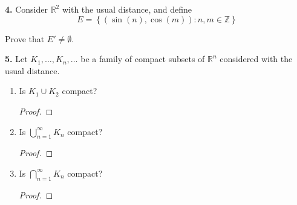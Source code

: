 \documentclass{article}
\newcommand{\R}{\mathbb{R}}
\newcommand{\Z}{\mathbb{Z}}
\newcommand{\set}[1]{\left\{ #1 \right\}}
\newcommand{\paren}[1]{\left( #1 \right)}
\begin{document}
\newpage %


\textbf{4. }
Consider $\R^2$ with the usual distance, and define
$$E = \set{\paren{\sin(n), \cos(m)} : n, m \in \Z}$$

Prove that $E' \ne \emptyset$.


\newpage %


\textbf{5. }
Let $K_1, \dots, K_n, \dots$ be a family of compact subsets of $\R^n$ considered with the usual distance.
\begin{enumerate}
    \item 
    Is $K_1 \cup K_2$ compact?
    \begin{proof}
        
    \end{proof}


    \item 
    Is $\bigcup_{n = 1}^\infty K_n$ compact?
    \begin{proof}
        
    \end{proof}


    \item 
    Is $\bigcap_{n = 1}^\infty K_n$ compact?
    \begin{proof}
        
    \end{proof}
\end{enumerate}
\end{document}
